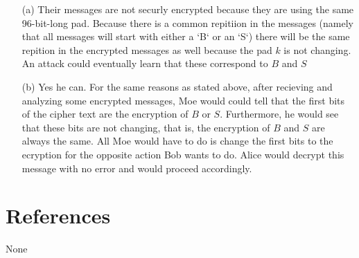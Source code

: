 \documentclass[11pt]{article}
\theoremstyle{definition}
\begin{document}
	\begin{enumerate}
		\item[(a)] Their messages are not securly encrypted because they are using the same 96-bit-long pad.  Because there is a common repitiion in the messages (namely that all messages will start with either a `B` or an `S`) there will be the same repition in the encrypted messages as well because the pad $k$ is not changing.  An attack could eventually learn that these correspond to $B$ and $S$

		\item[(b)] Yes he can.  For the same reasons as stated above, after recieving and analyzing some encrypted messages, Moe would could tell that the first bits of the cipher text are the encryption of $B$ or $S$.  Furthermore, he would see that these bits are not changing, that is, the encryption of $B$ and $S$ are always the same.  All Moe would have to do is change the first bits to the ecryption for the opposite action Bob wants to do.  Alice would decrypt this message with no error and would proceed accordingly.
	\end{enumerate}


\noindent\hrulefill


\section*{References}

None
\end{document}
